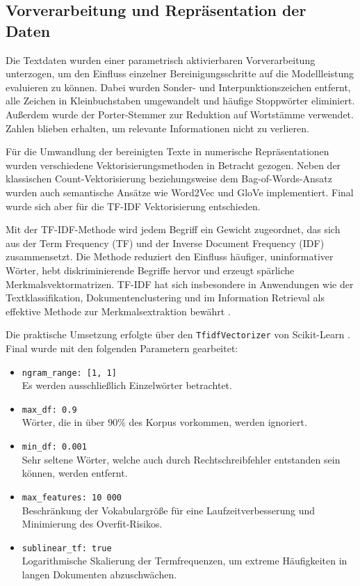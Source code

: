 \subsection{Vorverarbeitung und Repräsentation der Daten}
\label{sec:vorverarbeitung}

Die Textdaten wurden einer parametrisch aktivierbaren Vorverarbeitung unterzogen, um den Einfluss einzelner Bereinigungsschritte auf die Modellleistung evaluieren zu können. Dabei wurden Sonder- und Interpunktionszeichen entfernt, alle Zeichen in Kleinbuchstaben umgewandelt und häufige Stoppwörter eliminiert. Außerdem wurde der Porter-Stemmer \cite{Porter2006} zur Reduktion auf Wortstämme verwendet. Zahlen blieben erhalten, um relevante Informationen nicht zu verlieren.

Für die Umwandlung der bereinigten Texte in numerische Repräsentationen wurden verschiedene Vektorisierungsmethoden in Betracht gezogen. Neben der klassischen Count-Vektorisierung beziehungsweise dem Bag-of-Words-Ansatz wurden auch semantische Ansätze wie Word2Vec \cite{Mikolov2013} und GloVe \cite{Pennington2014} implementiert. Final wurde sich aber für die TF-IDF Vektorisierung entschieden.

Mit der TF-IDF-Methode wird jedem Begriff ein Gewicht zugeordnet, das sich aus der Term Frequency (TF) und der Inverse Document Frequency (IDF) zusammensetzt. Die Methode reduziert den Einfluss häufiger, uninformativer Wörter, hebt diskriminierende Begriffe hervor und erzeugt spärliche Merkmalsvektormatrizen. TF-IDF hat sich insbesondere in Anwendungen wie der Textklassifikation, Dokumentenclustering und im Information Retrieval als effektive Methode zur Merkmalsextraktion bewährt \cite{Manning2009}.

Die praktische Umsetzung erfolgte über den \texttt{TfidfVectorizer} von Scikit-Learn \cite{Pedregosa2011}. Final wurde mit den folgenden Parametern gearbeitet:
\begin{itemize}
    \item \texttt{ngram\_range: [1, 1]} \\ Es werden ausschließlich Einzelwörter betrachtet.
    \item \texttt{max\_df: 0.9} \\ Wörter, die in über 90\% des Korpus vorkommen, werden ignoriert.
    \item \texttt{min\_df: 0.001} \\ Sehr seltene Wörter, welche auch durch Rechtschreibfehler entstanden sein können, werden entfernt.
    \item \texttt{max\_features: 10\,000} \\ Beschränkung der Vokabulargröße für eine Laufzeitverbesserung und Minimierung des Overfit-Risikos.
    \item \texttt{sublinear\_tf: true} \\ Logarithmische Skalierung der Termfrequenzen, um extreme Häufigkeiten in langen Dokumenten abzuschwächen.
\end{itemize}
